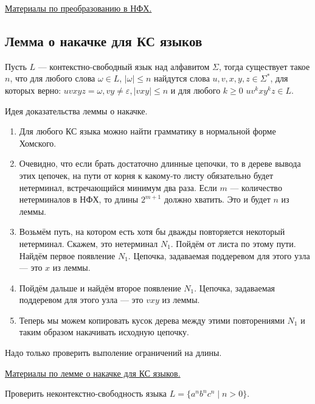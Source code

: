 \href{https://neerc.ifmo.ru/wiki/index.php?title=%D0%9D%D0%BE%D1%80%D0%BC%D0%B0%D0%BB%D1%8C%D0%BD%D0%B0%D1%8F_%D1%84%D0%BE%D1%80%D0%BC%D0%B0_%D0%A5%D0%BE%D0%BC%D1%81%D0%BA%D0%BE%D0%B3%D0%BE}{Материалы по преобразованию в НФХ.}


\subsection{Лемма о накачке для КС языков}

\begin{theorem}
Пусть $L$ --- контекстно-свободный язык над алфавитом $\Sigma$, тогда существует такое $n$, что для любого слова $\omega \in L$, $|\omega| \leq n$ найдутся слова $u,v,x,y,z\in \Sigma^*$, для которых верно: $uvxyz = \omega, vy\neq \varepsilon,|vxy|\leq n$ и для любого $k \geq 0$  $uv^kxy^kz \in L$.
\end{theorem}

Идея доказательства леммы о накачке.

\begin{enumerate}
	\item Для любого КС языка можно найти грамматику в нормальной форме Хомского.
	\item Очевидно, что если брать достаточно длинные цепочки, то в дереве вывода этих цепочек, на пути от корня к какому-то листу обязательно будет нетерминал, встречающийся минимум два раза. Если $m$ --- количество нетерминалов в НФХ, то длины $2^{m+1}$ должно хватить. Это и будет $n$ из леммы.
	\item Возьмём путь, на котором есть хотя бы дважды повторяется некоторый нетерминал. Скажем, это нетерминал  $N_1$. Пойдём от листа по этому пути. Найдём первое появление $N_1$. Цепочка, задаваемая поддеревом для этого узла --- это $x$ из леммы.
	\item Пойдём дальше и найдём второе появление $N_1$. Цепочка, задаваемая поддеревом для этого узла --- это $vxy$ из леммы.
	\item Теперь мы можем копировать кусок дерева между этими повторениями $N_1$ и таким образом накачивать исходную цепочку.
\end{enumerate}

Надо только проверить выполение ограничений на длины.

\href{https://neerc.ifmo.ru/wiki/index.php?title=%D0%9B%D0%B5%D0%BC%D0%BC%D0%B0_%D0%BE_%D1%80%D0%B0%D0%B7%D1%80%D0%B0%D1%81%D1%82%D0%B0%D0%BD%D0%B8%D0%B8_%D0%B4%D0%BB%D1%8F_%D0%9A%D0%A1-%D0%B3%D1%80%D0%B0%D0%BC%D0%BC%D0%B0%D1%82%D0%B8%D0%BA}{Материалы по лемме о накачке для КС языков.}

Проверить неконтекстно-свободность языка $L=\{a^nb^nc^n \mid n>0\}$.
